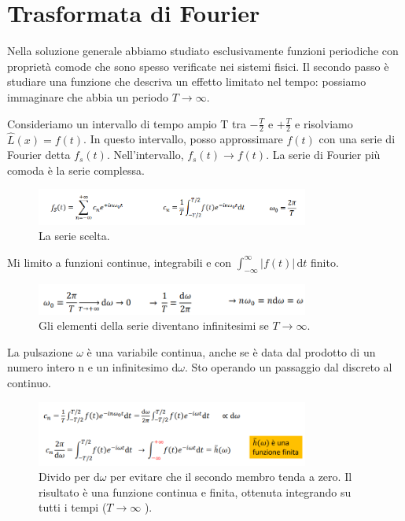 \section{Trasformata di Fourier}

Nella soluzione generale abbiamo studiato esclusivamente funzioni periodiche con proprietà comode che sono spesso verificate nei sistemi fisici. Il secondo passo è studiare una funzione che descriva un effetto limitato nel tempo: possiamo immaginare che abbia un periodo \(T \to \infty \).

Consideriamo un intervallo di tempo ampio T tra \(-\frac{T}{2}\) e \(+\frac{T}{2}\) e risolviamo \(\hat{L} (x) = f(t)\). In questo intervallo, posso approssimare \(f(t)\) con una serie di Fourier detta \(f_s(t)\). Nell'intervallo, \(f_s(t)\to f(t)\). La serie di Fourier più comoda è la serie complessa.

\begin{figure}[H]
	\centering
	\includegraphics[width=0.8\textwidth]{2024-03-07-09-20-30.png}
	\caption{La serie scelta.}
\end{figure}

Mi limito a funzioni continue, integrabili e con \(\int_{-\infty}^{\infty} \vert f(t) \vert  \,\mathrm{d}t \) finito.

\begin{figure}[H]
	\centering
	\includegraphics[width=0.8\textwidth]{2024-03-07-09-23-47.png}
	\caption{Gli elementi della serie diventano infinitesimi se \(T \to \infty \). }
\end{figure}

La pulsazione \(\omega \) è una variabile continua, anche se è data dal prodotto di un numero intero n e un infinitesimo \(\mathrm{d} \omega  \). Sto operando un passaggio dal discreto al continuo. 

\begin{figure}[H]
	\centering
	\includegraphics[width=0.8\textwidth]{2024-03-07-09-28-07.png}
	\caption{Divido per \(\mathrm{d}\omega  \) per evitare che il secondo membro tenda a zero. Il risultato è una funzione continua e finita, ottenuta integrando su tutti i tempi (\(T \to \infty \) ). }
\end{figure}


